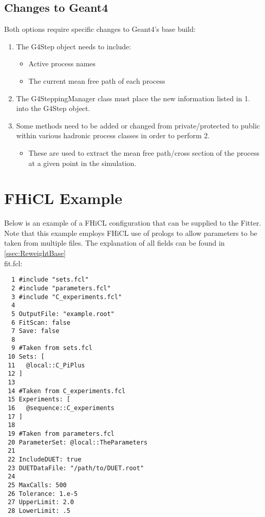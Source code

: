 \documentclass[12pt]{article}
\begin{document}
\subsection{Changes to Geant4}
Both options require specific changes to Geant4's base build:
\begin{enumerate}
\item The G4Step object needs to include:
	\begin{itemize}
	\item Active process names
	\item The current mean free path of each process
	\end{itemize}
	
\item The G4SteppingManager class must place the new information listed in 1. into the G4Step object. 

\item Some methods need to be added or changed from private/protected to public within various hadronic process classes in order to perform 2.
	\begin{itemize}
	\item These are used to extract the mean free path/cross section of the process at a given point in the simulation.
	\end{itemize}	
	
\end{enumerate}

\newpage
\appendix

\section{FHiCL Example}\label{app:FHiCL}

Below is an example of a FHiCL configuration that can be supplied to the Fitter. Note that this example employs FHiCL use of prologs to allow parameters to be taken from multiple files. The explanation of all fields can be found in \ref{ssec:ReweightBase}\\

fit.fcl:
\begin{lstlisting}
  1 #include "sets.fcl"
  2 #include "parameters.fcl"
  3 #include "C_experiments.fcl"
  4 
  5 OutputFile: "example.root"
  6 FitScan: false
  7 Save: false
  8 
  9 #Taken from sets.fcl
 10 Sets: [
 11   @local::C_PiPlus
 12 ]
 13 
 14 #Taken from C_experiments.fcl
 15 Experiments: [ 
 16   @sequence::C_experiments
 17 ]
 18 
 19 #Taken from parameters.fcl
 20 ParameterSet: @local::TheParameters
 21 
 22 IncludeDUET: true
 23 DUETDataFile: "/path/to/DUET.root"
 24 
 25 MaxCalls: 500
 26 Tolerance: 1.e-5
 27 UpperLimit: 2.0
 28 LowerLimit: .5

\end{lstlisting}
\newpage
\end{document}

